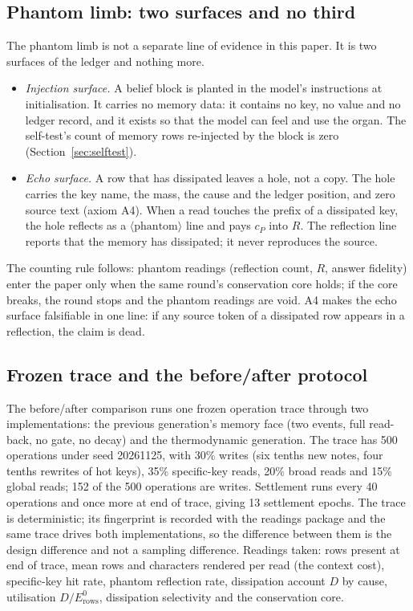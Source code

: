 \documentclass[11pt,a4paper]{article}
\newcommand{\Ezero}{E^{0}}
\begin{document}
\subsection{Phantom limb: two surfaces and no third}
\label{sec:phantom}
The phantom limb is not a separate line of evidence in this paper. It is two surfaces of the ledger and nothing more.
\begin{itemize}\setlength\itemsep{1pt}
\item \emph{Injection surface.} A belief block is planted in the model's instructions at initialisation. It carries no memory data: it contains no key, no value and no ledger record, and it exists so that the model can feel and use the organ. The self-test's count of memory rows re-injected by the block is zero (Section~\ref{sec:selftest}).
\item \emph{Echo surface.} A row that has dissipated leaves a hole, not a copy. The hole carries the key name, the mass, the cause and the ledger position, and zero source text (axiom A4). When a read touches the prefix of a dissipated key, the hole reflects as a $\langle\text{phantom}\rangle$ line and pays $c_P$ into $R$. The reflection line reports that the memory has dissipated; it never reproduces the source.
\end{itemize}
The counting rule follows: phantom readings (reflection count, $R$, answer fidelity) enter the paper only when the same round's conservation core holds; if the core breaks, the round stops and the phantom readings are void. A4 makes the echo surface falsifiable in one line: if any source token of a dissipated row appears in a reflection, the claim is dead.

\subsection{Frozen trace and the before/after protocol}
\label{sec:trace}
The before/after comparison runs one frozen operation trace through two implementations: the previous generation's memory face (two events, full read-back, no gate, no decay) and the thermodynamic generation. The trace has 500 operations under seed 20261125, with 30\% writes (six tenths new notes, four tenths rewrites of hot keys), 35\% specific-key reads, 20\% broad reads and 15\% global reads; 152 of the 500 operations are writes. Settlement runs every 40 operations and once more at end of trace, giving 13 settlement epochs. The trace is deterministic; its fingerprint is recorded with the readings package and the same trace drives both implementations, so the difference between them is the design difference and not a sampling difference. Readings taken: rows present at end of trace, mean rows and characters rendered per read (the context cost), specific-key hit rate, phantom reflection rate, dissipation account $D$ by cause, utilisation $D/\Ezero_{\mathrm{rows}}$, dissipation selectivity and the conservation core.
\end{document}
